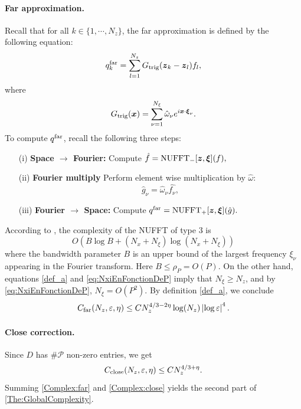 \documentclass[smallextended]{svjour3}
\begin{document}
\paragraph{Far approximation.} Recall that for all $k \in \{1,\cdots,N_z\}$, the far approximation is defined by the following equation:
\[ q^{\text{far}}_k = \sum_{l=1}^{N_z} G_{\textup{trig}}(\boldsymbol{z}_k - \boldsymbol{z}_l) f_l,\]
where
\[ G_{\textup{trig}}(\boldsymbol{x}) = \sum_{\nu=1}^{N_\xi} \hat{\omega}_\nu e^{i \boldsymbol{x} \cdot \boldsymbol{\xi}_\nu}.\]
To compute $q^{\textup{far}}$, recall the following three steps:
\begin{itemize}
	\setlength{\itemindent}{2em}
	\item[(i)] \textbf{Space $\rightarrow$ Fourier: } Compute $\hat{f} = \textup{NUFFT}_-[\boldsymbol{z},\boldsymbol{\xi}](f),$
	\item[(ii)] \textbf{Fourier multiply} Perform element wise multiplication by $\hat{\omega}$: 
	\[\hat{g}_{\nu} = \hat{\omega}_\nu \hat{f_\nu},\]
	\item[(iii)] \textbf{Fourier $\rightarrow$ Space: } Compute $q^{\text{far}} =  \textup{NUFFT}_+[\boldsymbol{z},\boldsymbol{\xi}](\hat{g}).$
	\setlength{\itemindent}{0em}
\end{itemize}
According to \cite[Sec.	 4.3]{keiner2009using}, the complexity of the NUFFT of type 3 is 
\[O\left(B\log B + (N_x + N_\xi)\log(N_x+N_\xi)\right)\]
where the bandwidth parameter $B$ is an upper bound of the largest frequency $\xi_\nu$ appearing in the Fourier transform. Here $B \leq \rho_P = O(P)$. On the other hand, equations \eqref{def_a} and  \eqref{eq:NxiEnFonctionDeP} imply that $N_{\xi} \geq N_z$, and by \eqref{eq:NxiEnFonctionDeP}, $N_\xi = O(P^2)$. By definition \eqref{def_a}, we conclude
\begin{equation}
	\label{Complex:far}
	C_{\textup{far}}(N_z,\varepsilon,\eta) \leq C N_z^{4/3 - 2\eta}\log(N_z) \left\lvert \log \varepsilon \right\rvert^{4} .
\end{equation}
\paragraph{Close correction.} Since $D$ has $\# \mathcal{P}$ non-zero entries, we get 
\begin{equation}
	\label{Complex:close}
	C_{\textup{close}}(N_z,\varepsilon,\eta) \leq C N_z^{4/3 + \eta}.
\end{equation}
Summing \eqref{Complex:far} and \eqref{Complex:close} yields the second part of \autoref{The:GlobalComplexity}. 
\end{document}
